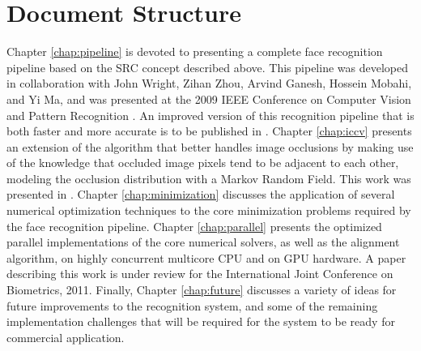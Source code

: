 \section{Document Structure}
%
Chapter \ref{chap:pipeline} is devoted to presenting a complete face
recognition pipeline based on the SRC concept described above. 
This pipeline was developed in collaboration with John Wright,
Zihan Zhou, Arvind Ganesh, Hossein Mobahi, and Yi Ma, and was
presented at the 2009 IEEE Conference on Computer Vision and Pattern Recognition
\cite{WagnerA2009-CVPR}.  An improved version of this recognition pipeline that
is both faster and more accurate is to be published in \cite{WagnerA2011-PAMI}.
%
Chapter \ref{chap:iccv} presents an extension of the algorithm that better
handles image occlusions by making use of the knowledge that occluded image
pixels tend to be adjacent to each other, modeling the occlusion distribution
with a Markov Random Field.  This work was presented in \cite{ZhouZ2009}.
%
Chapter \ref{chap:minimization} discusses the application of several numerical
optimization techniques to the core minimization problems required by the face
recognition pipeline.
%
Chapter \ref{chap:parallel} presents the optimized parallel implementations of
the core numerical solvers, as well as the alignment algorithm, on highly
concurrent multicore CPU and on GPU hardware.  A paper describing this work
is under review for the International Joint Conference on Biometrics, 2011.
%
Finally, Chapter \ref{chap:future} discusses a variety of ideas for future
improvements to the recognition system, and some of the remaining
implementation challenges that will be required for the system to be ready for
commercial application.
 
